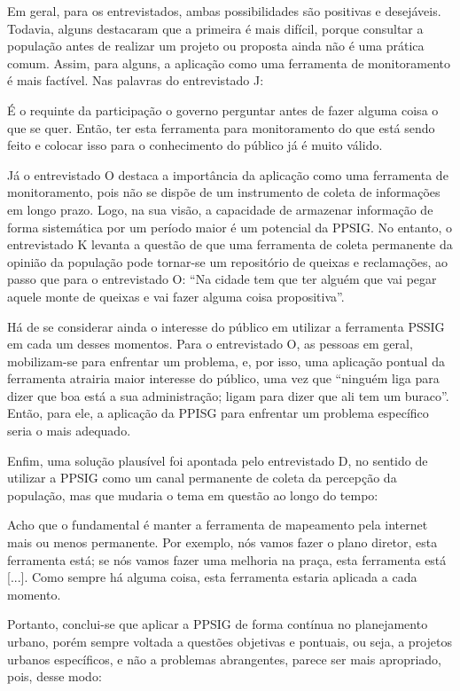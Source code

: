 \documentclass{article}
\begin{document}
Em geral, para os entrevistados, ambas possibilidades são positivas e
desejáveis.
Todavia, alguns destacaram que a primeira é mais difícil, porque consultar a
população antes de realizar um projeto ou proposta ainda não é uma prática
comum. Assim, para alguns, a aplicação como uma ferramenta de monitoramento é
mais factível. Nas palavras do entrevistado J:

É o requinte da participação o governo perguntar antes de fazer alguma coisa
o que se quer. Então, ter esta ferramenta para monitoramento do que está
sendo feito e colocar isso para o conhecimento do público já é muito válido.

Já o entrevistado O destaca a importância da aplicação como uma ferramenta de
monitoramento, pois não se dispõe de um instrumento de coleta de informações em
longo prazo. Logo, na sua visão, a capacidade de armazenar informação de forma
sistemática por um período maior é um potencial da PPSIG. No entanto, o
entrevistado K levanta a questão de que uma ferramenta de coleta permanente da
opinião da população pode tornar-se um repositório de queixas e reclamações, ao
passo que para o entrevistado O: “Na cidade tem que ter alguém que vai
pegar aquele monte de queixas e vai fazer alguma coisa
propositiva”.

Há de se considerar ainda o interesse do público em utilizar a ferramenta PSSIG
em cada um desses momentos. Para o entrevistado O, as pessoas em geral,
mobilizam-se para enfrentar um problema, e, por isso, uma aplicação pontual da
ferramenta atrairia maior interesse do público, uma vez que “ninguém
liga para dizer que boa está a sua administração; ligam para dizer que ali
tem um buraco”. Então, para ele, a aplicação da PPISG para
enfrentar um problema específico seria o mais adequado.

Enfim, uma solução plausível foi apontada pelo entrevistado D, no sentido de
utilizar a PPSIG como um canal permanente de coleta da percepção da população,
mas que mudaria o tema em questão ao longo do tempo:

Acho que o fundamental é manter a ferramenta de mapeamento pela internet mais
ou menos permanente. Por exemplo, nós vamos fazer o plano diretor, esta
ferramenta está; se nós vamos fazer uma melhoria na praça, esta ferramenta
está [...]. Como sempre há alguma coisa, esta ferramenta
estaria aplicada a cada momento.

Portanto, conclui-se que aplicar a PPSIG de forma contínua no planejamento
urbano, porém sempre voltada a questões objetivas e pontuais, ou seja, a
projetos urbanos específicos, e não a problemas abrangentes, parece ser mais
apropriado, pois, desse modo:
\end{document}
